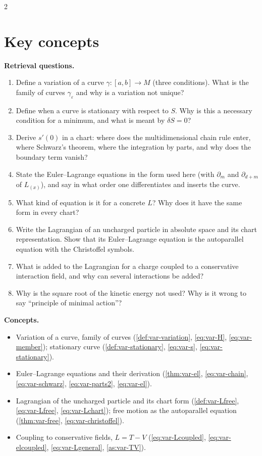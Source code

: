 \begin{paracol}{2}
\section*{Key concepts}
\begin{keyconcepts}
\textbf{Retrieval questions.}
\begin{enumerate}
  \item Define a variation of a curve $\gamma\colon[a,b]\to M$ (three conditions). What is the family of curves $\gamma_\varepsilon$ and why is a variation not unique?
  \item Define when a curve is stationary with respect to $S$. Why is this a necessary condition for a minimum, and what is meant by $\delta S=0$?
  \item Derive $s'(0)$ in a chart: where does the multidimensional chain rule enter, where Schwarz's theorem, where the integration by parts, and why does the boundary term vanish?
  \item State the Euler--Lagrange equations in the form used here (with $\partial_m$ and $\partial_{d+m}$ of $L_{(x)}$), and say in what order one differentiates and inserts the curve.
  \item What kind of equation is it for a concrete $L$? Why does it have the same form in every chart?
  \item Write the Lagrangian of an uncharged particle in absolute space and its chart representation. Show that its Euler--Lagrange equation is the autoparallel equation with the Christoffel symbols.
  \item What is added to the Lagrangian for a charge coupled to a conservative interaction field, and why can several interactions be added?
  \item Why is the square root of the kinetic energy not used? Why is it wrong to say ``principle of minimal action''?
\end{enumerate}
\textbf{Concepts.}
\begin{itemize}
  \item Variation of a curve, family of curves (\cref{def:var-variation}, \eqref{eq:var-H}, \eqref{eq:var-member}); stationary curve (\cref{def:var-stationary}, \eqref{eq:var-s}, \eqref{eq:var-stationary}).
  \item Euler--Lagrange equations and their derivation (\cref{thm:var-el}, \eqref{eq:var-chain}, \eqref{eq:var-schwarz}, \eqref{eq:var-parts2}, \eqref{eq:var-el}).
  \item Lagrangian of the uncharged particle and its chart form (\cref{def:var-Lfree}, \eqref{eq:var-Lfree}, \eqref{eq:var-Lchart}); free motion as the autoparallel equation (\cref{thm:var-free}, \eqref{eq:var-christoffel}).
  \item Coupling to conservative fields, $L=T-V$ (\eqref{eq:var-Lcoupled}, \eqref{eq:var-elcoupled}, \eqref{eq:var-Lgeneral}, \cref{as:var-TV}).
\end{itemize}
\end{keyconcepts}

\flushside
\end{paracol}
